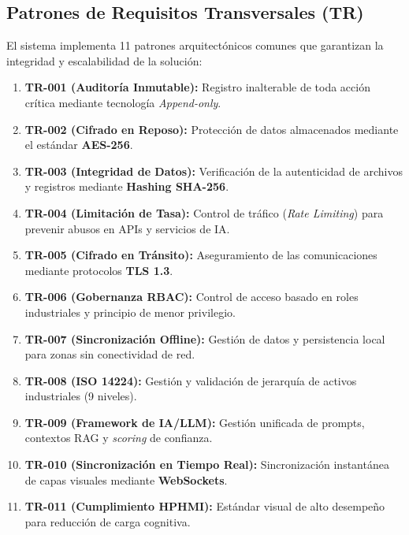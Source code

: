 \subsection{Patrones de Requisitos Transversales (TR)}

El sistema implementa 11 patrones arquitectónicos comunes que garantizan la integridad y escalabilidad de la solución:

\begin{enumerate}
    \item \textbf{TR-001 (Auditoría Inmutable):} Registro inalterable de toda acción crítica mediante tecnología \textit{Append-only}.
    \item \textbf{TR-002 (Cifrado en Reposo):} Protección de datos almacenados mediante el estándar \textbf{AES-256}.
    \item \textbf{TR-003 (Integridad de Datos):} Verificación de la autenticidad de archivos y registros mediante \textbf{Hashing SHA-256}.
    \item \textbf{TR-004 (Limitación de Tasa):} Control de tráfico (\textit{Rate Limiting}) para prevenir abusos en APIs y servicios de IA.
    \item \textbf{TR-005 (Cifrado en Tránsito):} Aseguramiento de las comunicaciones mediante protocolos \textbf{TLS 1.3}.
    \item \textbf{TR-006 (Gobernanza RBAC):} Control de acceso basado en roles industriales y principio de menor privilegio.
    \item \textbf{TR-007 (Sincronización Offline):} Gestión de datos y persistencia local para zonas sin conectividad de red.
    \item \textbf{TR-008 (ISO 14224):} Gestión y validación de jerarquía de activos industriales (9 niveles).
    \item \textbf{TR-009 (Framework de IA/LLM):} Gestión unificada de prompts, contextos RAG y \textit{scoring} de confianza.
    \item \textbf{TR-010 (Sincronización en Tiempo Real):} Sincronización instantánea de capas visuales mediante \textbf{WebSockets}.
    \item \textbf{TR-011 (Cumplimiento HPHMI):} Estándar visual de alto desempeño para reducción de carga cognitiva.
\end{enumerate}
